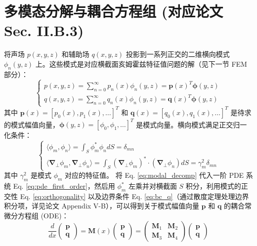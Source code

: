 \documentclass{ctexart}
\begin{document}
\section{多模态分解与耦合方程组 (对应论文 Sec. II.B.3)}
将声场 $p(x,y,z)$ 和辅助场 $q(x,y,z)$ 投影到一系列正交的二维横向模式 $\phi_n(y,z)$ 上。这些模式是对应横截面亥姆霍兹特征值问题的解（见下一节 FEM 部分）：
\begin{equation} \label{eq:modal_decomp}
\begin{cases}
p(x,y,z) = \sum_{n=0}^{\infty} p_n(x) \phi_n(y,z) = \mathbf{p}(x)^T \boldsymbol{\phi}(y,z) \\
q(x,y,z) = \sum_{n=0}^{\infty} q_n(x) \phi_n(y,z) = \mathbf{q}(x)^T \boldsymbol{\phi}(y,z)
\end{cases}
\end{equation}
其中 $\mathbf{p}(x) = [p_0(x), p_1(x), \dots]^T$ 和 $\mathbf{q}(x) = [q_0(x), q_1(x), \dots]^T$ 是待求的模式幅值向量，$\boldsymbol{\phi}(y,z) = [\phi_0, \phi_1, \dots]^T$ 是模式向量。横向模式满足正交归一化条件：
\begin{equation} \label{eq:orthogonality}
\begin{cases}
\langle \phi_m, \phi_n \rangle = \int_S \phi_m^* \phi_n dS = \delta_{mn} \\
\langle \boldsymbol{\nabla}_\perp \phi_m, \boldsymbol{\nabla}_\perp \phi_n \rangle = \int_S (\boldsymbol{\nabla}_\perp \phi_m)^* \cdot (\boldsymbol{\nabla}_\perp \phi_n) dS = \gamma_m^2 \delta_{mn}
\end{cases}
\end{equation}
其中 $\gamma_m^2$ 是模式 $\phi_m$ 对应的特征值。
将 Eq. \eqref{eq:modal_decomp} 代入一阶 PDE 系统 Eq. \eqref{eq:pde_first_order}，然后用 $\phi_m^*$ 左乘并对横截面 $S$ 积分，利用模式的正交性 Eq. \eqref{eq:orthogonality} 以及边界条件 Eq. \eqref{eq:bc_q}（通过散度定理处理边界积分项，详见论文 Appendix V-B），可以得到关于模式幅值向量 $\mathbf{p}$ 和 $\mathbf{q}$ 的耦合常微分方程组 (ODE)：
\begin{equation} \label{eq:ode_coupled}
\frac{d}{dx}
\begin{pmatrix} \mathbf{p} \\
\mathbf{q} \end{pmatrix}
= \mathbf{M}(x)
\begin{pmatrix} \mathbf{p} \\
\mathbf{q} \end{pmatrix}
=
\begin{pmatrix}
\mathbf{M}_1 & \mathbf{M}_2 \\
\mathbf{M}_3 & \mathbf{M}_4
\end{pmatrix}
\begin{pmatrix} \mathbf{p} \\
\mathbf{q} \end{pmatrix}
\end{equation}
\end{document}
